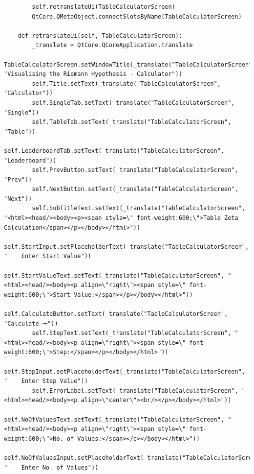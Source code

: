 \documentclass{article}
\begin{document}
\begin{lstlisting}
        self.retranslateUi(TableCalculatorScreen)
        QtCore.QMetaObject.connectSlotsByName(TableCalculatorScreen)

    def retranslateUi(self, TableCalculatorScreen):
        _translate = QtCore.QCoreApplication.translate
        TableCalculatorScreen.setWindowTitle(_translate("TableCalculatorScreen", "Visualising the Riemann Hypothesis - Calculator"))
        self.Title.setText(_translate("TableCalculatorScreen", "Calculator"))
        self.SingleTab.setText(_translate("TableCalculatorScreen", "Single"))
        self.TableTab.setText(_translate("TableCalculatorScreen", "Table"))
        self.LeaderboardTab.setText(_translate("TableCalculatorScreen", "Leaderboard"))
        self.PrevButton.setText(_translate("TableCalculatorScreen", "Prev"))
        self.NextButton.setText(_translate("TableCalculatorScreen", "Next"))
        self.SubTitleText.setText(_translate("TableCalculatorScreen", "<html><head/><body><p><span style=\" font-weight:600;\">Table Zeta Calculation</span></p></body></html>"))
        self.StartInput.setPlaceholderText(_translate("TableCalculatorScreen", "    Enter Start Value"))
        self.StartValueText.setText(_translate("TableCalculatorScreen", "<html><head/><body><p align=\"right\"><span style=\" font-weight:600;\">Start Value:</span></p></body></html>"))
        self.CalculateButton.setText(_translate("TableCalculatorScreen", "Calculate 🠖"))
        self.StepText.setText(_translate("TableCalculatorScreen", "<html><head/><body><p align=\"right\"><span style=\" font-weight:600;\">Step:</span></p></body></html>"))
        self.StepInput.setPlaceholderText(_translate("TableCalculatorScreen", "    Enter Step Value"))
        self.ErrorLabel.setText(_translate("TableCalculatorScreen", "<html><head/><body><p align=\"center\"><br/></p></body></html>"))
        self.NoOfValuesText.setText(_translate("TableCalculatorScreen", "<html><head/><body><p align=\"right\"><span style=\" font-weight:600;\">No. of Values:</span></p></body></html>"))
        self.NoOfValuesInput.setPlaceholderText(_translate("TableCalculatorScreen", "    Enter No. of Values"))
\end{lstlisting}
\end{document}
